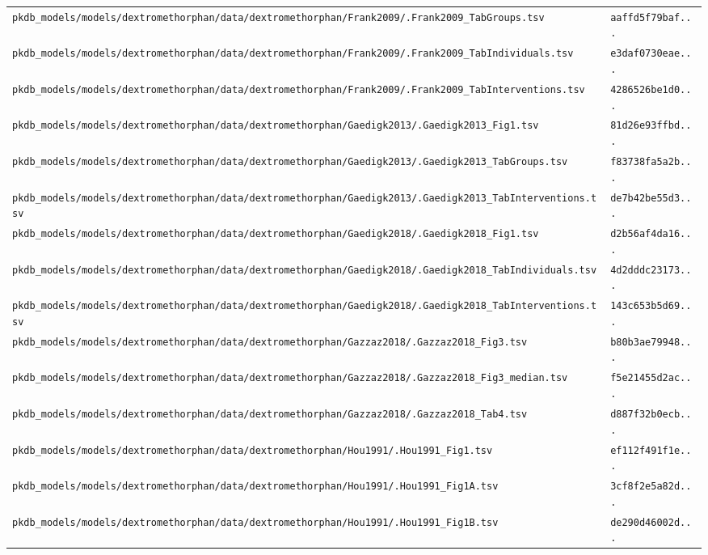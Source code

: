 \documentclass{article}
\begin{document}
\begin{longtable}{ll}
\texttt{pkdb\_models/models/dextromethorphan/data/dextromethorphan/Frank2009/.Frank2009\_TabGroups.tsv} & \texttt{aaffd5f79baf...} \\
\texttt{pkdb\_models/models/dextromethorphan/data/dextromethorphan/Frank2009/.Frank2009\_TabIndividuals.tsv} & \texttt{e3daf0730eae...} \\
\texttt{pkdb\_models/models/dextromethorphan/data/dextromethorphan/Frank2009/.Frank2009\_TabInterventions.tsv} & \texttt{4286526be1d0...} \\
\texttt{pkdb\_models/models/dextromethorphan/data/dextromethorphan/Gaedigk2013/.Gaedigk2013\_Fig1.tsv} & \texttt{81d26e93ffbd...} \\
\texttt{pkdb\_models/models/dextromethorphan/data/dextromethorphan/Gaedigk2013/.Gaedigk2013\_TabGroups.tsv} & \texttt{f83738fa5a2b...} \\
\texttt{pkdb\_models/models/dextromethorphan/data/dextromethorphan/Gaedigk2013/.Gaedigk2013\_TabInterventions.tsv} & \texttt{de7b42be55d3...} \\
\texttt{pkdb\_models/models/dextromethorphan/data/dextromethorphan/Gaedigk2018/.Gaedigk2018\_Fig1.tsv} & \texttt{d2b56af4da16...} \\
\texttt{pkdb\_models/models/dextromethorphan/data/dextromethorphan/Gaedigk2018/.Gaedigk2018\_TabIndividuals.tsv} & \texttt{4d2dddc23173...} \\
\texttt{pkdb\_models/models/dextromethorphan/data/dextromethorphan/Gaedigk2018/.Gaedigk2018\_TabInterventions.tsv} & \texttt{143c653b5d69...} \\
\texttt{pkdb\_models/models/dextromethorphan/data/dextromethorphan/Gazzaz2018/.Gazzaz2018\_Fig3.tsv} & \texttt{b80b3ae79948...} \\
\texttt{pkdb\_models/models/dextromethorphan/data/dextromethorphan/Gazzaz2018/.Gazzaz2018\_Fig3\_median.tsv} & \texttt{f5e21455d2ac...} \\
\texttt{pkdb\_models/models/dextromethorphan/data/dextromethorphan/Gazzaz2018/.Gazzaz2018\_Tab4.tsv} & \texttt{d887f32b0ecb...} \\
\texttt{pkdb\_models/models/dextromethorphan/data/dextromethorphan/Hou1991/.Hou1991\_Fig1.tsv} & \texttt{ef112f491f1e...} \\
\texttt{pkdb\_models/models/dextromethorphan/data/dextromethorphan/Hou1991/.Hou1991\_Fig1A.tsv} & \texttt{3cf8f2e5a82d...} \\
\texttt{pkdb\_models/models/dextromethorphan/data/dextromethorphan/Hou1991/.Hou1991\_Fig1B.tsv} & \texttt{de290d46002d...} \\

\end{longtable}
\end{document}
